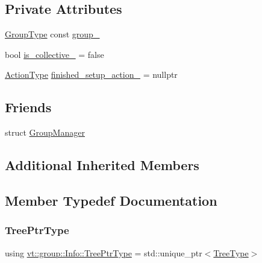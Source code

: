 \subsection*{Private Attributes}
\begin{DoxyCompactItemize}
\item 
\hyperlink{namespacevt_a27b5e4411c9b6140c49100e050e2f743}{Group\+Type} const \hyperlink{structvt_1_1group_1_1_info_acf2b210e3a0cb0d52649e42f07bc2503}{group\+\_\+}
\item 
bool \hyperlink{structvt_1_1group_1_1_info_acd32c5194bb1d6ac815b1f20cda1944d}{is\+\_\+collective\+\_\+} = false
\item 
\hyperlink{namespacevt_ae0a5a7b18cc99d7b732cb4d44f46b0f3}{Action\+Type} \hyperlink{structvt_1_1group_1_1_info_a40d013d297772502f189d08c7d474a6f}{finished\+\_\+setup\+\_\+action\+\_\+} = nullptr
\end{DoxyCompactItemize}
\subsection*{Friends}
\begin{DoxyCompactItemize}
\item 
struct \hyperlink{structvt_1_1group_1_1_info_a698f77439e02c4d3309fed882290c09c}{Group\+Manager}
\end{DoxyCompactItemize}
\subsection*{Additional Inherited Members}


\subsection{Member Typedef Documentation}
\mbox{\label{structvt_1_1group_1_1_info_ad381b46b3d09499ac670457aa3b5a0ba}} 
\subsubsection{\texorpdfstring{Tree\+Ptr\+Type}{TreePtrType}}
{\footnotesize\ttfamily using \hyperlink{structvt_1_1group_1_1_info_ad381b46b3d09499ac670457aa3b5a0ba}{vt\+::group\+::\+Info\+::\+Tree\+Ptr\+Type} =  std\+::unique\+\_\+ptr$<$\hyperlink{structvt_1_1group_1_1_info_base_a96e01b6097ed7b2bc299027d0a7a1b1e}{Tree\+Type}$>$}

